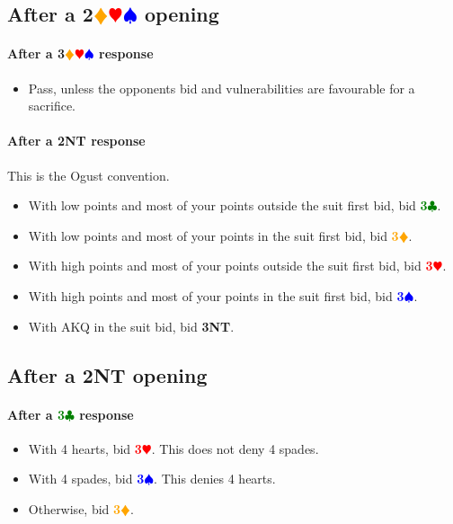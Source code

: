 \documentclass{article}
\newcommand{\Hs}{\textcolor{Red}{$\varheart$}}
\newcommand{\Ss}{\textcolor{Blue}{$\spadesuit$}}
\newcommand{\Ds}{\textcolor{Orange}{$\vardiamond$}}
\newcommand{\Cs}{\textcolor{Green}{$\clubsuit$}}
\newcommand{\NTs}{\textbf{\footnotesize{NT}}}
\renewcommand{\H}[1]{\textcolor{Red}{\textbf{#1}\Hs}}
\renewcommand{\S}[1]{\textcolor{Blue}{\textbf{#1}\Ss}}
\newcommand{\D}[1]{\textcolor{Orange}{\textbf{#1}\Ds}}
\newcommand{\C}[1]{\textcolor{Green}{\textbf{#1}\Cs}}
\newcommand{\NT}[1]{\textbf{#1\NTs}}
\newcommand{\notclubs}[1]{\textbf{#1}\Ds\Hs\Ss}
\begin{document}
\subsection{After a \notclubs{2} opening}

\paragraph{After a \notclubs{3} response}
\begin{itemize}
\item Pass, unless the opponents bid and vulnerabilities are favourable for a sacrifice.
\end{itemize}

\paragraph{After a \NT{2} response}

This is the Ogust convention.

\begin{itemize}
\item With low points and most of your points outside the suit first bid, bid \C{3}.
\item With low points and most of your points in the suit first bid, bid \D{3}.
\item With high points and most of your points outside the suit first bid, bid \H{3}.
\item With high points and most of your points in the suit first bid, bid \S{3}.
\item With AKQ in the suit bid, bid \NT{3}.
\end{itemize}

\subsection{After a \NT{2} opening}

\paragraph{After a \C{3} response}

\begin{itemize}
\item With 4 hearts, bid \H{3}. This does not deny 4 spades.
\item With 4 spades, bid \S{3}. This denies 4 hearts.
\item Otherwise, bid \D{3}.
\end{itemize}
\end{document}
